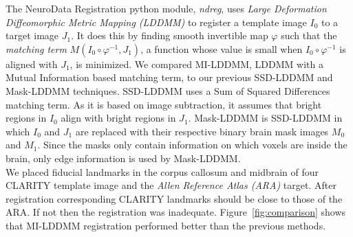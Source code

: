 \documentclass[simplex.tex]{subfiles}
\begin{document}
The NeuroData Registration python module, \textit{ndreg}, uses \textit{Large Deformation Diffeomorphic Metric Mapping (LDDMM)} to register a template image $I_0$ to a target image $J_1$.
It does this by finding smooth invertible map $\varphi$ such that the \textit{matching term} $M(I_0 \circ \varphi^{-1}, J_1)$, a function whose value is small when $I_0 \circ \varphi^{-1}$ is aligned with $J_1$, is minimized.
We compared MI-LDDMM, LDDMM with a Mutual Information based matching term, to our previous SSD-LDDMM and Mask-LDDMM techniques.
SSD-LDDMM uses a Sum of Squared Differences matching term.
As it is based on image subtraction, it assumes that bright regions in $I_0$ align with bright regions in $J_1$.
Mask-LDDMM is SSD-LDDMM in which $I_0$ and $J_1$ are replaced with their respective binary brain mask images $M_0$ and $M_1$.
Since the masks only contain information on which voxels are inside the brain, only edge information is used by Mask-LDDMM.
\\
We placed fiducial landmarks in the corpus callosum and midbrain of four CLARITY template image and the \textit{Allen Reference Atlas (ARA)} target.
After registration corresponding CLARITY landmarks should be close to those of the ARA. 
If not then the registration was inadequate.
Figure~\ref{fig:comparison} shows that MI-LDDMM registration performed better than the previous methods.
\end{document}

